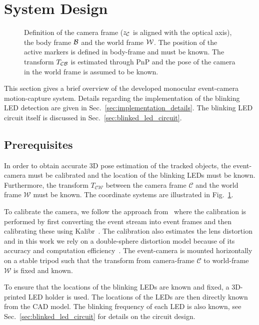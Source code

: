 \section{System Design}
\label{sec:system_design}

\begin{figure}
    \centering
    
    \caption{Definition of the camera frame ($z_{\mathcal{C}}$ is aligned with the optical axis), the body frame $\mathcal{B}$ and the world frame $\mathcal{W}$. The position of the active markers is defined in body-frame and must be known. The transform $T_{\mathcal{C} \mathcal{B}}$ is estimated through PnP and the pose of the camera in the world frame is assumed to be known.}
    \label{fig:coordinate_systems}
\end{figure}

This section gives a brief overview of the developed monocular event-camera motion-capture system. Details regarding the implementation of the blinking LED detection are given in Sec.~\ref{sec:implementation_details}. The blinking LED circuit itself is discussed in Sec.~\ref{sec:blinked_led_circuit}.

\subsection{Prerequisites}
In order to obtain accurate 3D pose estimation of the tracked objects, the event-camera must be calibrated and the location of the blinking LEDs must be known. Furthermore, the transform $T_{\mathcal{CW}}$ between the camera frame $\mathcal{C}$ and the world frame $\mathcal{W}$ must be known. The coordinate systems are illustrated in Fig.~\ref{fig:coordinate_systems}.

To calibrate the camera, we follow the approach from~\cite{muglikar2021calibrate} where the calibration is performed by first converting the event stream into event frames and then calibrating these using Kalibr~\cite{rehder2016extending}. The calibration also estimates the lens distortion and in this work we rely on a double-sphere distortion model because of its accuracy and computation efficiency~\cite{usenko2018doublesphere}. The event-camera is mounted horizontally on a stable tripod such that the transform from camera-frame $\mathcal{C}$ to world-frame $\mathcal{W}$ is fixed and known.

To ensure that the locations of the blinking LEDs are known and fixed, a 3D-printed LED holder is used. The locations of the LEDs are then directly known from the CAD model. The blinking frequency of each LED is also known, see Sec.~\ref{sec:blinked_led_circuit} for details on the circuit design.

